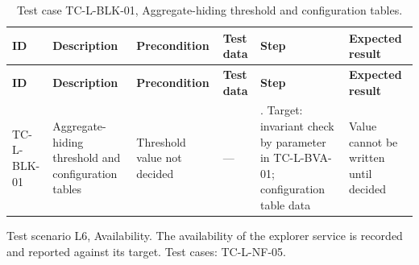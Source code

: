 {\footnotesize{}\renewcommand{\arraystretch}{1.1}
\begin{longtable}{|>{\raggedright\arraybackslash}p{}|>{\raggedright\arraybackslash}p{}|>{\raggedright\arraybackslash}p{}|>{\raggedright\arraybackslash}p{}|>{\raggedright\arraybackslash}p{}|>{\raggedright\arraybackslash}p{}|}
\caption{Test case TC-\allowbreak{}L-\allowbreak{}BLK-\allowbreak{}01, Aggregate-\allowbreak{}hiding threshold and configuration tables.} \\
\hline
\textbf{ID} & \textbf{Description} & \textbf{Precondition} & \textbf{Test data} & \textbf{Step} & \textbf{Expected result} \\ \hline
\endfirsthead
\hline
\textbf{ID} & \textbf{Description} & \textbf{Precondition} & \textbf{Test data} & \textbf{Step} & \textbf{Expected result} \\ \hline
\endhead
TC-L-BLK-01 & Aggregate-\allowbreak{}hiding threshold and configuration tables & Threshold value not decided & --- & 1. Target: invariant check by parameter in TC-\allowbreak{}L-\allowbreak{}BVA-\allowbreak{}01; configuration table data & Value cannot be written until decided \\ \hline
\end{longtable}
}

Test scenario L6, Availability. The availability of the explorer service is recorded and reported against its target. Test cases: TC-L-NF-05.

